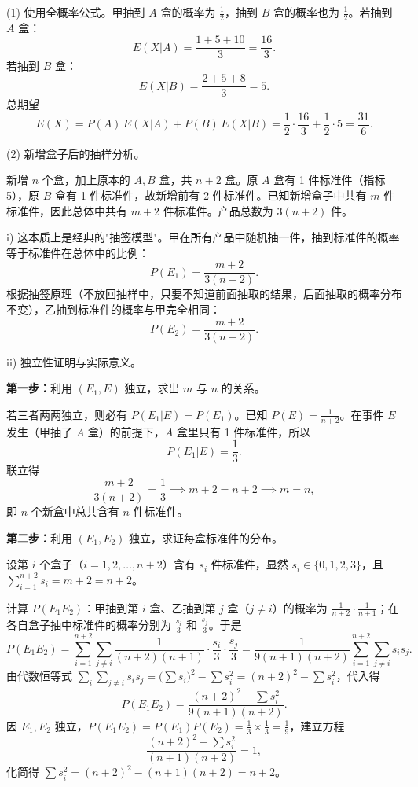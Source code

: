 \documentclass[lang=cn,11pt]{elegantbook}
\begin{document}
\begin{solution}
(1) 使用全概率公式。甲抽到 \(A\) 盒的概率为 \(\frac{1}{2}\)，抽到 \(B\) 盒的概率也为 \(\frac{1}{2}\)。若抽到 \(A\) 盒：
\[E(X|A) = \frac{1+5+10}{3} = \frac{16}{3}.\]
若抽到 \(B\) 盒：
\[E(X|B) = \frac{2+5+8}{3} = 5.\]
总期望
\[E(X) = P(A)\,E(X|A) + P(B)\,E(X|B) = \frac{1}{2}\cdot\frac{16}{3} + \frac{1}{2}\cdot 5 = \frac{31}{6}.\]

(2) 新增盒子后的抽样分析。

新增 \(n\) 个盒，加上原本的 \(A,B\) 盒，共 \(n+2\) 盒。原 \(A\) 盒有 1 件标准件（指标 5），原 \(B\) 盒有 1 件标准件，故新增前有 2 件标准件。已知新增盒子中共有 \(m\) 件标准件，因此总体中共有 \(m+2\) 件标准件。产品总数为 \(3(n+2)\) 件。

i) 这本质上是经典的"抽签模型"。甲在所有产品中随机抽一件，抽到标准件的概率等于标准件在总体中的比例：
\[P(E_1) = \frac{m+2}{3(n+2)}.\]
根据抽签原理（不放回抽样中，只要不知道前面抽取的结果，后面抽取的概率分布不变），乙抽到标准件的概率与甲完全相同：
\[P(E_2) = \frac{m+2}{3(n+2)}.\]

ii) 独立性证明与实际意义。

\textbf{第一步：}利用 \((E_1,E)\) 独立，求出 \(m\) 与 \(n\) 的关系。

若三者两两独立，则必有 \(P(E_1|E) = P(E_1)\)。已知 \(P(E) = \frac{1}{n+2}\)。在事件 \(E\) 发生（甲抽了 \(A\) 盒）的前提下，\(A\) 盒里只有 1 件标准件，所以
\[P(E_1|E) = \frac{1}{3}.\]
联立得
\[\frac{m+2}{3(n+2)} = \frac{1}{3} \implies m+2 = n+2 \implies m = n,\]
即 \(n\) 个新盒中总共含有 \(n\) 件标准件。

\textbf{第二步：}利用 \((E_1,E_2)\) 独立，求证每盒标准件的分布。

设第 \(i\) 个盒子（\(i=1,2,\dots,n+2\)）含有 \(s_i\) 件标准件，显然 \(s_i \in \{0,1,2,3\}\)，且 \(\sum_{i=1}^{n+2} s_i = m+2 = n+2\)。

计算 \(P(E_1 E_2)\)：甲抽到第 \(i\) 盒、乙抽到第 \(j\) 盒（\(j \neq i\)）的概率为 \(\frac{1}{n+2}\cdot\frac{1}{n+1}\)；在各自盒子抽中标准件的概率分别为 \(\frac{s_i}{3}\) 和 \(\frac{s_j}{3}\)。于是
\[
P(E_1 E_2) = \sum_{i=1}^{n+2}\sum_{j \neq i} \frac{1}{(n+2)(n+1)}\cdot\frac{s_i}{3}\cdot\frac{s_j}{3}
= \frac{1}{9(n+1)(n+2)}\sum_{i=1}^{n+2}\sum_{j \neq i}s_is_j.
\]
由代数恒等式 \(\displaystyle\sum_{i}\sum_{j \neq i}s_is_j = \bigl(\sum s_i\bigr)^2 - \sum s_i^2 = (n+2)^2 - \sum s_i^2\)，代入得
\[
P(E_1 E_2) = \frac{(n+2)^2 - \sum s_i^2}{9(n+1)(n+2)}.
\]
因 \(E_1, E_2\) 独立，\(P(E_1 E_2) = P(E_1)P(E_2) = \frac{1}{3}\times\frac{1}{3} = \frac{1}{9}\)，建立方程
\[
\frac{(n+2)^2 - \sum s_i^2}{(n+1)(n+2)} = 1,
\]
化简得 \(\displaystyle\sum s_i^2 = (n+2)^2 - (n+1)(n+2) = n+2\)。


\end{solution}
\end{document}
